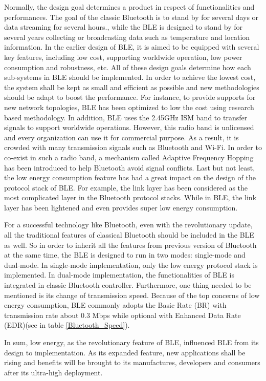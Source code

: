 \documentclass{cseminar}
\begin{document}
Normally, the design goal determines a product in respect of functionalities and performances. The goal of the classic Bluetooth is to stand by for several days or data streaming for several hours., while the BLE is designed to stand by for several years collecting or broadcasting data such as temperature and location information. In the earlier design of BLE, it is aimed to be equipped with several key features, including low cost, supporting worldwide operation, low power consumption and robustness, etc. All of these design goals determine how each sub-systems in BLE should be implemented. In order to achieve the lowest cost, the system shall be kept as small and efficient as possible and new methodologies should be adapt to boost the performance. For instance, to provide supports for new network topologies, BLE has been optimized to low the cost using research based methodology\cite{BLEDH}. In addition, BLE uses the 2.45GHz ISM band to transfer signals to support worldwide operations. However, this radio band is unlicensed and every organization can use it for commercial purpose. As a result, it is crowded with many transmission signals such as  Bluetooth and Wi-Fi. In order to co-exist in such a radio band, a mechanism called Adaptive Frequency Hopping has been introduced to help Bluetooth avoid signal conflicts. Last but not least, the low energy consumption feature has had a great impact on the design of the protocol stack of BLE. For example, the link layer has been considered as the most complicated layer in the Bluetooth protocol stacks. While in BLE, the link layer has been lightened and even provides super low energy consumption.

For a successful technology like Bluetooth, even with the revolutionary update, all the traditional features of classical Bluetooth should be included in the BLE as well. So in order to inherit all the features from previous version of Bluetooth at the same time, the BLE is designed to run in two modes: single-mode and dual-mode. In single-mode implementation, only the low energy protocol stack is implemented. In dual-mode implementation, the functionalities of BLE is integrated in classic Bluetooth controller\cite{BLEWiki}. Furthermore, one thing needed to be mentioned is its change of transmission speed. Because of the top concerns of low energy consumption, BLE commonly adopts the Basic Rate (BR) with transmission rate about 0.3 Mbps while optional with Enhanced Data Rate (EDR)(see in table \ref{Bluetooth_Speed}).

In sum, low energy, as the revolutionary feature of BLE, influenced BLE from its design to implementation. As its expanded feature, new applications shall be rising and benefits will be brought to its manufactures, developers and consumers after its ultra-high deployment\cite{BLE01}.
\end{document}
